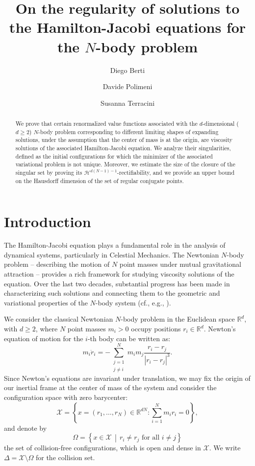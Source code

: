 \documentclass[a4paper,10pt]{amsart}
\title[Hamilton-Jacobi equations for the $N$-body problem ]{\textbf{On the regularity of solutions to the Hamilton-Jacobi equations for the $N$-body problem}}
\date{}
\author{Diego Berti}%
\author{Davide Polimeni}%
\author{Susanna Terracini}%
\theoremstyle{plain}
\theoremstyle{definition}
\numberwithin{equation}{section}
\numberwithin{thm}{section}
\begin{document}
\begin{abstract}

We prove that certain renormalized value functions associated with the $d$-dimensional ($d\geq2$) $N$-body problem corresponding to different limiting shapes of expanding solutions, under the assumption that the center of mass is at the origin, are viscosity solutions of the associated Hamilton-Jacobi equation. We analyze their singularities, defined as the initial configurations for which the minimizer of the associated variational problem is not unique. Moreover, we estimate the size of the closure of the singular set by proving its $\mathcal{H}^{d(N-1)-1}$-rectifiability, and we provide an upper bound on the Hausdorff dimension of the set of regular conjugate points.

\end{abstract}

\maketitle

\tableofcontents






\section{Introduction}The Hamilton-Jacobi equation plays a fundamental role in the analysis of dynamical systems, particularly in Celestial Mechanics. The Newtonian $N$-body problem -- describing the motion of $N$ point masses under mutual gravitational attraction -- provides a rich framework for studying viscosity solutions of the equation. Over the last two decades, substantial progress has been made in characterizing such solutions and connecting them to the geometric and variational properties of the $N$-body system (cf., e.g., \cite{MadernaVenturelli_GloballyMinimizingParabolic,MadernaVenturelli_HyperbolicMotions,Maderna2012, PercinoSanchez2014}).

We consider the classical Newtonian $N$-body problem in the Euclidean space $\mathbb{R}^d$, with $d \geq 2$, where $N$ point masses $m_i > 0$ occupy positions $r_i \in \mathbb{R}^d$. Newton's equation of motion for the $i$-th body can be written as:
\begin{displaymath}\label{eq:newton}
    m_i\ddot{r}_i = -\sum_{\substack{j=1 \\ j\neq i}}^{N} m_i m_j \frac{r_i - r_j}{|r_i - r_j|^3}.
\end{displaymath}
Since Newton's equations are invariant under translation, we may fix the origin of our inertial frame at the center of mass of the system and consider the configuration space with zero barycenter:
\[
    \mathcal{X} = \left\{x=(r_1,\ldots,r_N)\in\mathbb{R}^{dN} : \sum_{i=1}^{N} m_i r_i = 0\right\},
\]
and denote by
\[
    \Omega = \left\{x\in \mathcal{X} \,\middle|\, r_i \neq r_j \text{ for all } i \neq j\right\}
\]
the set of collision-free configurations, which is open and dense in $\mathcal{X}$. We write $\Delta = \mathcal{X} \setminus \Omega$ for the collision set.
\end{document}
